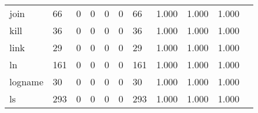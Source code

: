 \begin{longtable}{lp{1.20cm}p{1.20cm}p{1.20cm}p{1.20cm}p{1.20cm}p{1.20cm}p{1.20cm}p{1.20cm}p{1.20cm}p{1.20cm}}
join      &                                    66 &                                                  0 &                                                  0 &                                                  0 &                                                  0 &                                                 66 &                                         1.000 &                                              1.000 &                                              1.000 \\
kill      &                                    36 &                                                  0 &                                                  0 &                                                  0 &                                                  0 &                                                 36 &                                         1.000 &                                              1.000 &                                              1.000 \\
link      &                                    29 &                                                  0 &                                                  0 &                                                  0 &                                                  0 &                                                 29 &                                         1.000 &                                              1.000 &                                              1.000 \\
ln        &                                   161 &                                                  0 &                                                  0 &                                                  0 &                                                  0 &                                                161 &                                         1.000 &                                              1.000 &                                              1.000 \\
logname   &                                    30 &                                                  0 &                                                  0 &                                                  0 &                                                  0 &                                                 30 &                                         1.000 &                                              1.000 &                                              1.000 \\
ls        &                                   293 &                                                  0 &                                                  0 &                                                  0 &                                                  0 &                                                293 &                                         1.000 &                                              1.000 &                                              1.000 \\

\end{longtable}
